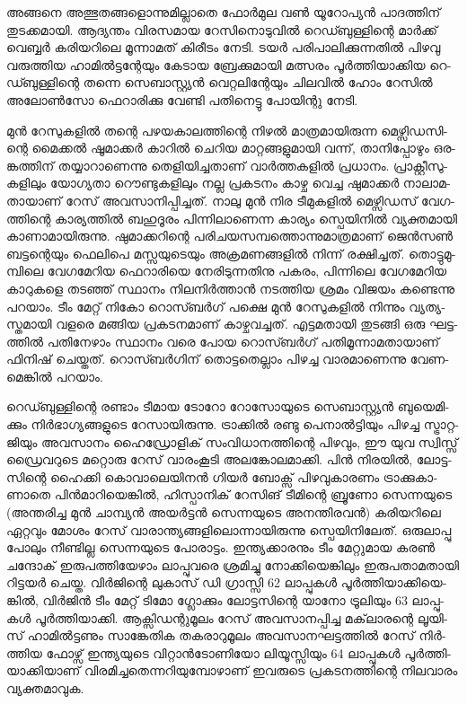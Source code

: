 \vskip 2pt

അ­ങ്ങ­നെ അത്ഭു­ത­ങ്ങ­ളൊ­ന്നു­മി­ല്ലാ­തെ ­ഫോര്‍­മുല വണ്‍ യൂ­റോ­പ്യന്‍ പാ­ദ­ത്തി­ന് തു­ട­ക്ക­മാ­യി. ആദ്യ­ന്തം 
വി­ര­സ­മായ റേ­സി­നൊ­ടു­വില്‍ റെ­ഡ്ബു­ള്ളി­ന്റെ മാര്‍­ക്ക് വെ­ബ്ബര്‍ കരി­യ­റി­ലെ മൂ­ന്നാ­മ­ത് കി­രീ­ടം നേ­ടി. 
ടയര്‍ പരി­പാ­ലി­ക്കു­ന്ന­തില്‍ പി­ഴ­വു വരു­ത്തിയ ഹാ­മില്‍­ട്ട­ന്റേ­യും കേ­ടായ ബ്രേ­ക്കു­മാ­യി മത്സ­രം 
പൂര്‍­ത്തി­യാ­ക്കിയ റെ­ഡ്ബു­ള്ളി­ന്റെ തന്നെ സെ­ബാ­സ്റ്റ്യന്‍ വെ­റ്റ­ലി­ന്റേ­യും ചി­ല­വില്‍ ഹോം റേ­സില്‍ 
അലോണ്‍­സോ ഫെ­റാ­രി­ക്കു വേ­ണ്ടി പതി­നെ­ട്ടു പോ­യി­ന്റു നേ­ടി­.

­മുന്‍ റേ­സു­ക­ളില്‍ തന്റെ പഴ­യ­കാ­ല­ത്തി­ന്റെ നി­ഴല്‍ മാ­ത്ര­മാ­യി­രു­ന്ന മെ­ഴ്സി­ഡ­സി­ന്റെ മൈ­ക്കല്‍ ­ഷൂ­മാ­ക്കര്‍ 
കാ­റില്‍ ചെ­റിയ മാ­റ്റ­ങ്ങ­ളു­മാ­യി വന്ന്, താ­നി­പ്പോ­ഴും ഒര­ങ്ക­ത്തി­ന് തയ്യാ­റാ­ണെ­ന്നു തെ­ളി­യി­ച്ച­താ­ണ് 
വാര്‍­ത്ത­ക­ളില്‍ പ്ര­ധാ­നം. പ്രാ­ക്റ്റീ­സു­ക­ളി­ലും യോ­ഗ്യ­താ റൌ­ണ്ടു­ക­ളി­ലും നല്ല പ്ര­ക­ട­നം കാ­ഴ്ച വെ­ച്ച ഷു­മാ­ക്കര്‍ 
നാ­ലാ­മ­താ­യാ­ണ് റേ­സ് അവ­സാ­നി­പ്പി­ച്ച­ത്. നാ­ലു മുന്‍ നിര ടീ­മു­ക­ളില്‍ മെ­ഴ്സി­ഡ­സ് വേ­ഗ­ത്തി­ന്റെ കാ­ര്യ­ത്തില്‍ 
ബഹു­ദൂ­രം പി­ന്നി­ലാ­ണെ­ന്ന കാ­ര്യം സ്പെ­യി­നില്‍ വ്യ­ക്ത­മാ­യി കാ­ണാ­മാ­യി­രു­ന്നു. ഷു­മാ­ക്ക­റി­ന്റെ 
പരി­ച­യ­സ­മ്പ­ത്തൊ­ന്നു­മാ­ത്ര­മാ­ണ് ജെന്‍­സണ്‍ ബട്ട­ന്റെ­യും ഫെ­ലി­പെ മസ്സ­യു­ടെ­യും അക്ര­മ­ണ­ങ്ങ­ളില്‍ നി­ന്ന് 
രക്ഷി­ച്ച­ത്. തൊ­ട്ടു­മു­മ്പി­ലെ വേ­ഗ­മേ­റിയ ഫെ­റാ­രി­യെ നേ­രി­ടു­ന്ന­തി­നു പക­രം, പി­ന്നി­ലെ വേ­ഗ­മേ­റിയ കാ­റു­ക­ളെ 
തട­ഞ്ഞ് സ്ഥാ­നം നി­ല­നിര്‍­ത്താന്‍ നട­ത്തിയ ശ്ര­മം വി­ജ­യം കണ്ടെ­ന്നു പറ­യാം. ടീം മേ­റ്റ് നി­കോ റൊ­സ്ബര്‍­ഗ് 
പക്ഷെ മുന്‍ റേ­സു­ക­ളില്‍ നി­ന്നും വ്യ­ത്യ­സ്ത­മാ­യി വള­രെ മങ്ങിയ പ്ര­ക­ട­ന­മാ­ണ് കാ­ഴ്ച­വ­ച്ച­ത്. എട്ട­മ­താ­യി തു­ട­ങ്ങി 
ഒരു ഘട്ട­ത്തില്‍ പതി­നേ­ഴാം സ്ഥാ­നം വരെ പോയ റൊ­സ്ബര്‍­ഗ് പതി­മൂ­ന്നാ­മ­താ­യാ­ണ് ഫി­നി­ഷ് ചെ­യ്ത­ത്. 
റൊ­സ്ബര്‍­ഗി­ന് തൊ­ട്ട­തെ­ല്ലാം പി­ഴ­ച്ച വാ­ര­മാ­ണെ­ന്നു വേ­ണ­മെ­ങ്കില്‍ പറ­യാം.

­റെ­ഡ്ബു­ള്ളി­ന്റെ രണ്ടാം ടീ­മായ ടോ­റോ റോ­സോ­യു­ടെ സെ­ബാ­സ്റ്റ്യന്‍ ബു­യെ­മി­ക്കും നിര്‍­ഭാ­ഗ്യ­ങ്ങ­ളു­ടെ റേ­സാ­യി­രു­ന്നു. 
ട്രാ­ക്കില്‍ രണ്ടു പെ­നാല്‍­ട്ടി­യും പി­ഴ­ച്ച സ്ട്രാ­റ്റ­ജി­യും അവ­സാ­നം ഹൈ­ഡ്രോ­ളി­ക് സം­വി­ധാ­ന­ത്തി­ന്റെ പി­ഴ­വും, ഈ യുവ 
സ്വി­സ്സ് ഡ്രൈ­വ­റു­ടെ മറ്റൊ­രു റേ­സ് വാ­രം­കൂ­ടി അല­ങ്കോ­ല­മാ­ക്കി. പിന്‍ നി­ര­യില്‍, ലോ­ട്ട­സി­ന്റെ ഹൈ­ക്കി 
കൊ­വാ­ലെ­യി­നന്‍ ഗി­യര്‍ ബോ­ക്സ് പി­ഴ­വു­കാ­ര­ണം ട്രാ­ക്കു­കാ­ണാ­തെ പിന്‍­മാ­റി­യെ­ങ്കില്‍, ഹി­സ്പാ­നി­ക് റേ­സി­ങ് ടീ­മി­ന്റെ 
ബ്രൂ­ണോ സെ­ന്നയു­ടെ (അ­ന്ത­രി­ച്ച മുന്‍ ചാ­മ്പ്യന്‍ അയര്‍­ട്ടന്‍ സെ­ന്ന­യു­ടെ അന­ന്തി­ര­വന്‍)­ കരി­യ­റി­ലെ ഏറ്റ­വും മോ­ശം 
റേ­സ് വാ­രാ­ന്ത്യ­ങ്ങ­ളി­ലൊ­ന്നാ­യി­രു­ന്നു സ്പെ­യി­നി­ലേ­ത്. ഒരു­ലാ­പ്പു പോ­ലും നീ­ണ്ടി­ല്ല സെ­ന്ന­യു­ടെ പോ­രാ­ട്ടം. ഇന്ത്യ­ക്കാ­ര­നും 
ടീം മേ­റ്റു­മായ കരണ്‍ ചന്ദോ­ക് ഇരു­പ­ത്തി­യേ­ഴാം ലാ­പ്പു­വ­രെ ശ്ര­മി­ച്ചു നോ­ക്കി­യെ­ങ്കി­ലും ഇരു­പ­താ­മ­താ­യി റി­ട്ട­യര്‍ ചെ­യ്ത. 
വിര്‍­ജി­ന്റെ ലു­കാ­സ് ഡി ഗ്രാ­സ്സി 62 ലാ­പ്പു­കള്‍ പൂര്‍­ത്തി­യാ­ക്കി­യെ­ങ്കില്‍, വിര്‍­ജിന്‍ ടീം മേ­റ്റ് ടി­മോ ഗ്ലോ­ക്കും ലോ­ട്ട­സി­ന്റെ 
യാ­നോ ട്രൂ­ലി­യും 63 ലാ­പ്പു­കള്‍ പൂര്‍­ത്തി­യാ­ക്കി. ആക്സി­ഡ­ന്റു­മൂ­ലം റേ­സ് അവ­സാ­ന­പ്പി­ച്ച മക്‌­ലാ­ര­ന്റെ ലൂ­യി­സ് 
ഹാ­മില്‍­ട്ട­ണും സാ­ങ്കേ­തിക തക­രാ­റു­മൂ­ലം അവ­സാ­ന­ഘ­ട്ട­ത്തില്‍ റേ­സ് നിര്‍­ത്തിയ ഫോ­ഴ്സ് ഇന്ത്യ­യു­ടെ വി­റ്റാന്‍­ടോ­ണി­യോ 
ലി­യൂ­സ്സി­യും 64 ലാ­പ്പു­കള്‍ പൂര്‍­ത്തി­യാ­ക്കി­യാ­ണ് വി­ര­മി­ച്ച­തെ­ന്ന­റി­യു­മ്പോ­ഴാ­ണ് ഇവ­രു­ടെ പ്ര­ക­ട­ന­ത്തി­ന്റെ നി­ല­വാ­രം 
വ്യ­ക്ത­മാ­വു­ക.

